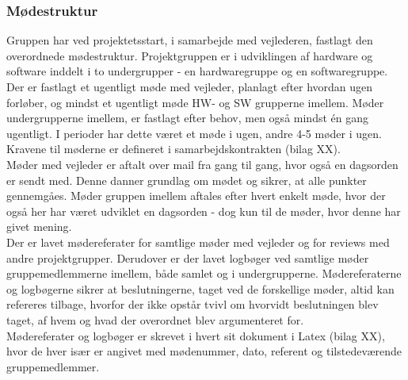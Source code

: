 \subsubsection{Mødestruktur}
Gruppen har ved projektetsstart, i samarbejde med vejlederen, fastlagt den overordnede mødestruktur. Projektgruppen er i udviklingen af hardware og software inddelt i to undergrupper - en hardwaregruppe og en softwaregruppe. Der er fastlagt et ugentligt møde med vejleder, planlagt efter hvordan ugen forløber, og mindst et ugentligt møde HW- og SW grupperne imellem. Møder  undergrupperne imellem, er fastlagt efter behov, men også mindst én gang ugentligt. I perioder har dette været et møde i ugen, andre 4-5 møder i ugen. Kravene til møderne er defineret i samarbejdskontrakten (bilag XX). \\
\newline
Møder med vejleder er aftalt over mail fra gang til gang, hvor også en dagsorden er sendt med. Denne danner grundlag om mødet og sikrer, at alle punkter gennemgåes. Møder gruppen imellem aftales efter hvert enkelt møde, hvor der også her har været udviklet en dagsorden - dog kun til de møder, hvor denne har givet mening.\\
\newline
Der er lavet mødereferater for samtlige møder med vejleder og for reviews med andre projektgrupper. Derudover er der lavet logbøger ved samtlige møder gruppemedlemmerne imellem, både samlet og i undergrupperne. Mødereferaterne og logbøgerne sikrer at beslutningerne, taget ved de forskellige møder, altid kan refereres tilbage, hvorfor der ikke opstår tvivl om hvorvidt beslutningen blev taget, af hvem og hvad der overordnet blev argumenteret for.\\
Mødereferater og logbøger er skrevet i hvert sit dokument i Latex (bilag XX), hvor de hver især er angivet med mødenummer, dato, referent og tilstedeværende gruppemedlemmer.  


